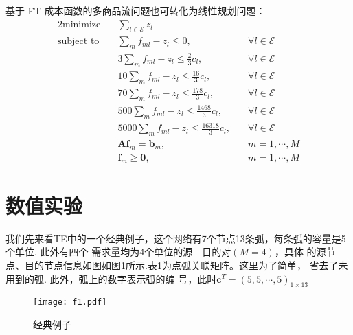 \documentclass[UTF8]{ctexart}
\begin{document}
基于 FT 成本函数的多商品流问题也可转化为线性规划问题：
\begin{alignat}{2}
\mbox{minimize}\quad &\sum_{l \in \mathcal{E}}z_l&{}\nonumber\\
\mbox{subject to}\quad &
\sum_{m} f_{ml}-z_l\leq 0,\quad&\forall l\in \mathcal{E} \nonumber\\
&3\sum_{m} f_{ml}-z_l\leq \frac{2}{3}c_{l},\quad&\forall l\in \mathcal{E} \nonumber\\
&10\sum_{m} f_{ml}-z_l\leq \frac{16}{3}c_{l},\quad&\forall l\in \mathcal{E} \nonumber\\
&70\sum_{m} f_{ml}-z_l\leq \frac{178}{3}c_{l},\quad&\forall l\in \mathcal{E} \nonumber\\
&500\sum_{m} f_{ml}-z_l\leq \frac{1468}{3}c_{l},\quad&\forall l\in \mathcal{E} \nonumber\\
&5000\sum_{m} f_{ml}-z_l\leq \frac{16318}{3}c_{l},\quad&\forall l\in \mathcal{E} \nonumber\\
&\bm{A}\bm{f}_m=\bm{b}_m,\quad &m=1,\cdots,M\nonumber\\
&\bm{f}_m \geq \bm{0},&m=1,\cdots,M
\end{alignat}

\newpage
\section{数值实验}
我们先来看TE中的一个经典例子，这个网络有7个节点13条弧，每条弧的容量是5个单位. 此外有四个
需求量均为4个单位的源—目的对$(M =4)$，具体
的源节点、目的节点信息如图如图\ref{fig:1}所示.表1为点弧关联矩阵。这里为了简单，
省去了未用到的弧. 此外，弧上的数字表示弧的编
号，此时$\bm{c}^T=(5,5,\cdots,5)_{1\times 13}$


\begin{figure}[h]
\small
\centering
\texttt{[image: f1.pdf]}
\caption{经典例子}
\label{fig:1}
\end{figure}
\end{document}
